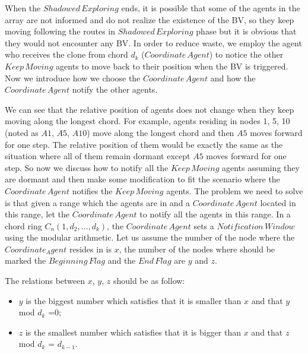 \documentclass[conference]{IEEEtran}
\begin{document}

When the $Shadowed\,Exploring$ ends, it is possible that some of the agents in the array are not informed and do not realize the existence of the BV, so they keep moving following the routes in $Shadowed\,Exploring$  phase but it is obvious that they would not encounter any BV. In order to reduce waste, we employ the agent who receives the clone from chord $d_k$ ($Coordinate\,Agent$) to notice the other $Keep\,Moving$ agents to move back to their position when the BV is triggered. Now we introduce how we choose the $Coordinate\,Agent$ and how the $Coordinate\,Agent$ notify the other agents.



We can see that the relative position of agents does not change when they keep moving along the longest chord. For example, agents residing in nodes 1, 5, 10 (noted as $A1$, $A5$, $A10$) move along the longest chord and then $A5$ moves forward for one step. The relative position of them would be exactly the same as the situation where all of them remain dormant except $A5$ moves forward for one step. So now we discuss how to notify all the $Keep\,Moving$ agents assuming they are dormant and then make some modification to fit the scenario where the $Coordinate\,Agent$ notifies the $Keep\,Moving$ agents. The problem we need to solve is that given a range which the agents are in and a $Coordinate\,Agent$ located in this range, let the $Coordinate\,Agent$ to notify all the agents in this range. In a chord ring $C_n(1, d_2, \ldots, d_k)$, the $Coordinate\,Agent$ sets a $Notification\,Window$ using the modular arithmetic. Let us assume the number of the node where the $Coordinate_Agent$ resides in is $x$, the number of the nodes where should be marked the $Beginning\,Flag$ and the $End\,Flag$ are $y$ and $z$. 

The relations between $x$, $y$, $z$ should be as follow: 

\begin{itemize}
\item $y$ is the biggest number which satisfies that it is smaller than $x$ and that $y$ mod $d_k$ =$0$; 
\item $z$ is the smallest number which satisfies that it is bigger than $x$ and that $z$ mod $d_k$ = $d_{k-1}$.
\end{itemize} 
\end{document}
